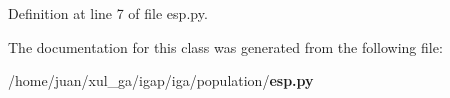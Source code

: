 \subsubsection{}\label{classiga_1_1population_1_1esp_1_1Esp_b0885e1ef5831f4e3dafe00d4b9d7a12}




Definition at line 7 of file esp.py.

The documentation for this class was generated from the following file:\begin{CompactItemize}
\item 
/home/juan/xul\_\-ga/igap/iga/population/{\bf esp.py}\end{CompactItemize}

